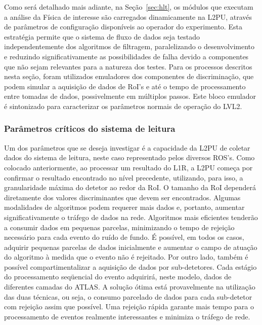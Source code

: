 Como será detalhado mais adiante, na Seção~\ref{sec:hlt}, os módulos que
executam a análise da Física de interesse são carregados dinamicamente na
L2PU, através de parâmetros de configuração disponíveis ao operador do
experimento. Esta estratégia permite que o sistema de fluxo de dados seja
testado independentemente dos algoritmos de filtragem, paralelizando o
desenvolvimento \cite{aa:tns-2004-2} e reduzindo significativamente as
possibilidades de falha devido a componentes que não sejam relevantes para a
natureza dos testes. Para os processos descritos nesta seção, foram utilizados
emuladores dos componentes de discriminação, que podem simular a aquisição de
dados de RoI's e até o tempo de processamento entre tomadas de dados,
possivelmente em múltiplos passos. Este bloco emulador é sintonizado para
caracterizar os parâmetros normais de operação do LVL2.

\subsubsection{Parâmetros críticos do sistema de leitura}

Um dos parâmetros que se deseja investigar é a capacidade da L2PU de coletar
dados do sistema de leitura, neste caso representado pelos diversos
ROS's. Como colocado anteriormente, ao processar um resultado do L1R, a L2PU
começa por confirmar o resultado encontrado no nível precedente, utilizando,
para isso, a granularidade máxima do detetor ao redor da RoI. O tamanho da RoI
dependerá diretamente dos valores discriminantes que devem ser
encontrados. Algumas modalidades de algoritmos podem requerer mais dados e,
portanto, aumentar significativamente o tráfego de dados na rede. Algoritmos
mais eficientes tenderão a consumir dados em pequenas parcelas, minimizando o
tempo de rejeição necessário para cada evento do ruído de fundo. É possível,
em todos os casos, adquirir pequenas parcelas de dados inicialmente e aumentar
o campo de atuação do algoritmo à medida que o evento não é rejeitado. Por
outro lado, também é possível compartimentalizar a aquisição de dados por
sub-detetores. Cada estágio do processamento seqüencial do evento adquirirá,
neste modelo, dados de diferentes camadas do ATLAS. A solução ótima está
provavelmente na utilização das duas técnicas, ou seja, o consumo parcelado de
dados para cada sub-detetor com rejeição assim que possível. Uma rejeição
rápida garante mais tempo para o processamento de eventos realmente
interessantes e minimiza o tráfego de rede.

